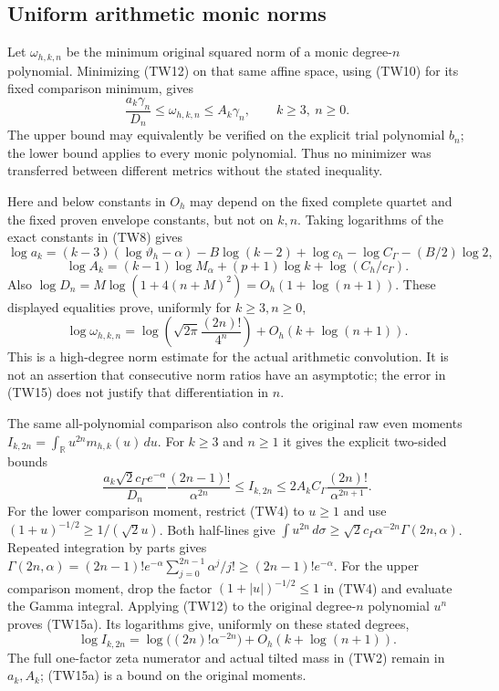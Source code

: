 \subsection{Uniform arithmetic monic norms}

Let $\omega_{h,k,n}$ be the minimum original squared norm of a monic
degree-$n$ polynomial.  Minimizing (TW12) on that same affine space,
using (TW10) for its fixed comparison minimum, gives
\[
 \boxed{\frac{a_k\gamma_n}{D_n}\leq\omega_{h,k,n}
 \leq A_k\gamma_n,\qquad k\geq3,\ n\geq0.}\tag{TW14}
\]
The upper bound may equivalently be verified on the explicit trial
polynomial $b_n$; the lower bound applies to every monic polynomial.
Thus no minimizer was transferred between different metrics without
the stated inequality.

Here and below constants in $O_h$ may depend on the fixed complete
quartet and the fixed proven envelope constants, but not on $k,n$.
Taking logarithms of the exact constants in (TW8) gives
\[
 \log a_k=(k-3)(\log\vartheta_h-\alpha)-B\log(k-2)
            +\log c_h-\log C_\Gamma-(B/2)\log2,
\]
\[
 \log A_k=(k-1)\log M_\alpha+(p+1)\log k
                       +\log(C_h/c_\Gamma).
\]
Also $\log D_n=M\log(1+4(n+M)^2)=O_h(1+\log(n+1))$.
These displayed equalities prove, uniformly for $k\geq3,n\geq0$,
\[
 \boxed{\log\omega_{h,k,n}=
 \log\!\left(\sqrt{2\pi}\frac{(2n)!}{4^n}\right)
 +O_h(k+\log(n+1)).}\tag{TW15}
\]
This is a high-degree norm estimate for the actual arithmetic convolution.
It is not an assertion that consecutive norm ratios have an asymptotic;
the error in (TW15) does not justify that differentiation in $n$.

The same all-polynomial comparison also controls the original raw even
moments $I_{k,2n}=\int_{\mathbb R}u^{2n}m_{h,k}(u)\,du$.  For
$k\geq3$ and $n\geq1$ it gives the explicit two-sided bounds
\[
 \boxed{
 \frac{a_k\sqrt2c_\Gamma e^{-\alpha}}{D_n}
       \frac{(2n-1)!}{\alpha^{2n}}
 \leq I_{k,2n}
 \leq2A_k C_\Gamma\frac{(2n)!}{\alpha^{2n+1}}.}
 \tag{TW15a}
\]
For the lower comparison moment, restrict (TW4) to $u\geq1$ and
use $(1+u)^{-1/2}\geq1/(\sqrt2u)$.  Both half-lines give
$\int u^{2n}\,d\sigma\geq\sqrt2c_\Gamma
\alpha^{-2n}\Gamma(2n,\alpha)$.
Repeated integration by parts gives
$\Gamma(2n,\alpha)=(2n-1)!e^{-\alpha}
\sum_{j=0}^{2n-1}\alpha^j/j!\geq(2n-1)!e^{-\alpha}$.
For the upper comparison moment, drop the factor
$(1+|u|)^{-1/2}\leq1$ in (TW4) and evaluate the Gamma integral.
Applying (TW12) to the original degree-$n$ polynomial $u^n$ proves
(TW15a).  Its logarithms give, uniformly on these stated degrees,
\[
 \log I_{k,2n}=\log\bigl((2n)!\alpha^{-2n}\bigr)
                    +O_h(k+\log(n+1)).\tag{TW15b}
\]
The full one-factor zeta numerator and actual tilted mass in (TW2)
remain in $a_k,A_k$; (TW15a) is a bound on the original moments.

